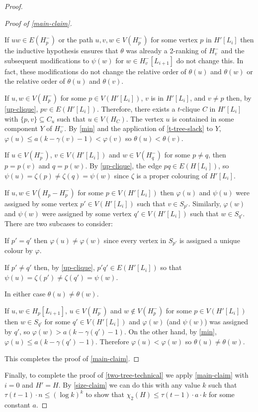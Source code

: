 \documentclass[kpfonts]{patmorin}
\newcommand{\trn}{\chi_2}
\theoremstyle{named}
\begin{document}
\begin{proof}
\begin{proof}[Proof of \cref{main-claim}]
\begin{compactenum}
          \item If $uw\in E(H^-_p)$ or the path $u,v,w\in V(H^-_p)$ for some vertex $p$ in $H'[L_i]$ then the inductive hypothesis ensures that $\theta$ was already a 2-ranking of $H^-_v$ and the subsequent modifications to $\psi(w)$ for $w\in H^-_v[L_{i+1}]$ do not change this. In fact, these modifications do not change the relative order of $\theta(u)$ and $\theta(w)$ or the relative order of $\theta(u)$ and $\theta(v)$.

          \item If $u,w\in V(H^-_p)$ for some $p\in V(H'[L_i])$, $v$ is in $H'[L_i]$, and $v\neq p$ then, by \cref{up-clique}, $pv\in E(H'[L_i])$.  Therefore, there exists a $t$-clique $C$ in $H'[L_i]$ with $\{p,v\}\subseteq C_u$ such that $u\in V(H_{C})$.  The vertex $u$ is contained in some component $Y$ of $H^-_v$. By \cref{min} and the application of \cref{t-tree-slack} to $Y$, $\varphi(u)\le a(k-\gamma(v)-1) < \varphi(v)$ so $\theta(u) < \theta(v)$.

          \item If $u\in V(H^-_{p})$, $v\in V(H'[L_i])$ and $w\in V(H^-_q)$ for some $p\neq q$, then $p=p(v)$ and $q=p(w)$.  By \cref{up-clique}, the edge $pq\in E(H[L_i])$, so $\psi(u)=\zeta(p)\neq\zeta(q)=\psi(w)$ since $\zeta$ is a proper colouring of $H'[L_i]$.

          \item If $u,w\in V(H_{p}-H^-_{p})$ for some $p\in V(H'[L_i])$ then $\varphi(u)$ and $\psi(u)$ were assigned by some vertex $p'\in V(H'[L_i])$ such that $v\in S_{p'}$.  Similarly, $\varphi(w)$ and $\psi(w)$ were assigned by some vertex $q'\in V(H'[L_i])$ such that $w\in S_{q'}$.  There are two subcases to consider:
          \begin{compactenum}
            \item If $p'=q'$ then $\varphi(u)\neq\varphi(w)$ since every vertex in $S_{p'}$ is assigned a unique colour by $\varphi$.
            \item If $p'\neq q'$ then, by \cref{up-clique}, $p'q'\in E(H'[L_i])$ so that $\psi(u)=\zeta(p')\neq\zeta(q')=\psi(w)$.
        \end{compactenum}
        In either case $\theta(u)\neq\theta(w)$.

        \item If $u,w\in H_p[L_{i+1}]$, $u\in V(H^-_{p})$ and $w\not\in V(H^-_{p})$ for some $p\in V(H'[L_i])$ then $w\in S_{q'}$ for some $q'\in V(H'[L_i])$ and $\varphi(w)$ (and $\psi(w)$) was assigned by $q'$, so $\varphi(w)>a(k-\gamma(q')-1)$. On the other hand, by \cref{min}, $\varphi(u) \le a(k-\gamma(q')-1)$.  Therefore $\varphi(u)<\varphi(w)$ so $\theta(u)\neq\theta(w)$.
      \end{compactenum}
      This completes the proof of \cref{main-claim}.
    \end{proof}
    Finally, to complete the proof of \cref{two-tree-technical} we apply \cref{main-claim} with $i=0$ and $H'=H$.  By \cref{size-claim} we can do this with any value $k$ such that $\tau(t-1)\cdot n \le (\log k)^{k}$ to show that $\trn(H)\le \tau(t-1)\cdot a\cdot k$ for some constant $a$.
\end{proof}
\end{document}
